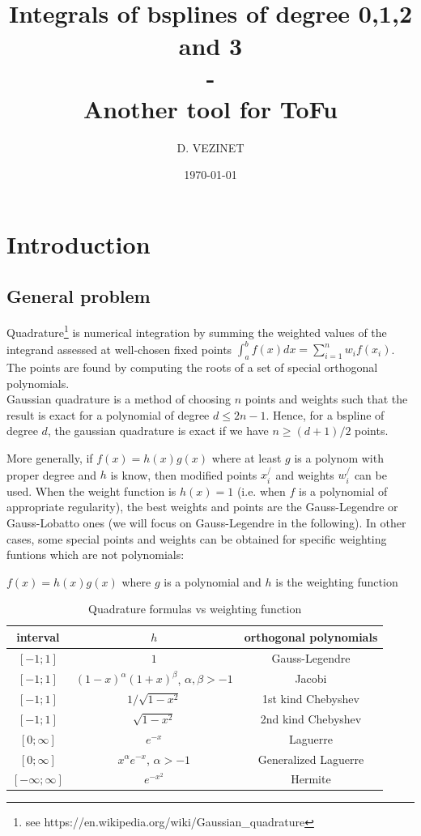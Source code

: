 \documentclass[paper=a4, fontsize=11pt]{scrartcl}
\title{
		\usefont{OT1}{bch}{b}{n}
		\horrule{0.5pt} \\[0.2cm]
		\LARGE Integrals of bsplines of degree 0,1,2 and 3\\
        -\\
        \normalsize Another tool for ToFu
		\horrule{2pt} \\[0.3cm]
}
\author{D. VEZINET}
\date{\today}
\numberwithin{equation}{section}		%
\numberwithin{figure}{section}			%
\numberwithin{table}{section}				%
\begin{document}
\maketitle

\tableofcontents

\newpage
\section{Introduction}

\subsection{General problem}

Quadrature\footnote{see https://en.wikipedia.org/wiki/Gaussian\_quadrature} is numerical integration by summing the weighted values of the integrand assessed at well-chosen fixed points $\int_a^b f(x)dx = \sum_{i=1}^n w_if(x_i)$.
The points are found by computing the roots of a set of special orthogonal polynomials.\\

Gaussian quadrature is a method of choosing $n$ points and weights such that the result is exact for a polynomial of degree $d \leq 2n-1$.
Hence, for a bspline of degree $d$, the gaussian quadrature is exact if we have $n \geq (d+1)/2$ points.

More generally, if $f(x)=h(x)g(x)$ where at least $g$ is a polynom with proper degree and $h$ is know, then modified points $x_i^/$ and weights $w_i^/$ can be used.
When the weight function is $h(x)=1$ (i.e. when $f$ is a polynomial of appropriate regularity), the best weights and points are the Gauss-Legendre or Gauss-Lobatto ones (we will focus on Gauss-Legendre in the following).
In other cases, some special points and weights can be obtained for specific weighting funtions which are not polynomials:


\begin{table}[hbtp]
\caption{\label{Tab:11Form}Quadrature formulas vs weighting function}
\centering
\scriptsize $f(x)=h(x)g(x)$ where $g$ is a polynomial and $h$ is the weighting function
\centering
\begin{tabular}{@{}ccc}
\hline
interval & $h$ & orthogonal polynomials\\
\hline
$[-1;1]$ & $1$ & Gauss-Legendre \\
$[-1;1]$ & $(1-x)^{\alpha}(1+x)^{\beta}$, $\alpha,\beta>-1$ & Jacobi \\
$[-1;1]$ & $1/\sqrt{1-x^2}$ & 1st kind Chebyshev \\
$[-1;1]$ & $\sqrt{1-x^2}$ & 2nd kind Chebyshev \\
$[0;\infty]$ & $e^{-x}$ & Laguerre \\
$[0;\infty]$ & $x^{\alpha}e^{-x}$, $\alpha>-1$ & Generalized Laguerre \\
$[-\infty;\infty]$ & $e^{-x^2}$ & Hermite \\
\hline
\end{tabular}
\end{table}
\end{document}
